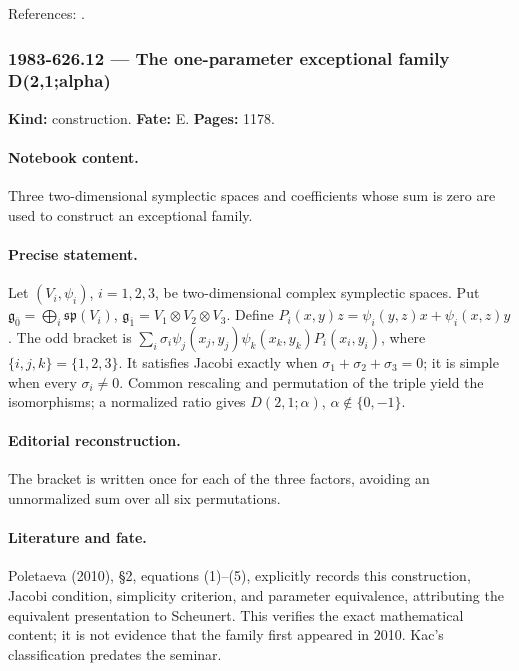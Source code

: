 \noindent References: \citep{kac1977sketch}.\par

\subsubsection{1983-626.12 --- The one-parameter exceptional family D(2,1;alpha)}

\label{item:1983-626.12}

\noindent\textbf{Kind:} construction. \textbf{Fate:} E. \textbf{Pages:} 1178.\par

\paragraph{Notebook content.} Three two-dimensional symplectic spaces and coefficients whose sum is zero are used to construct an exceptional family.

\paragraph{Precise statement.} Let \((V_i,\psi_i)\), \(i=1,2,3\), be two-dimensional complex symplectic spaces. Put \(\mathfrak g_{\overline0}=\bigoplus_i\mathfrak{sp}(V_i)\), \(\mathfrak g_{\overline1}=V_1\otimes V_2\otimes V_3\). Define \(P_i(x,y)z=\psi_i(y,z)x+\psi_i(x,z)y\). The odd bracket is \(\sum_i\sigma_i\psi_j(x_j,y_j)\psi_k(x_k,y_k)P_i(x_i,y_i)\), where \(\{i,j,k\}=\{1,2,3\}\). It satisfies Jacobi exactly when \(\sigma_1+\sigma_2+\sigma_3=0\); it is simple when every \(\sigma_i\ne0\). Common rescaling and permutation of the triple yield the isomorphisms; a normalized ratio gives \(D(2,1;\alpha)\), \(\alpha\notin\{0,-1\}\).

\paragraph{Editorial reconstruction.} The bracket is written once for each of the three factors, avoiding an unnormalized sum over all six permutations.

\paragraph{Literature and fate.} Poletaeva (2010), \S2, equations (1)–(5), explicitly records this construction, Jacobi condition, simplicity criterion, and parameter equivalence, attributing the equivalent presentation to Scheunert. This verifies the exact mathematical content; it is not evidence that the family first appeared in 2010. Kac’s classification predates the seminar.

